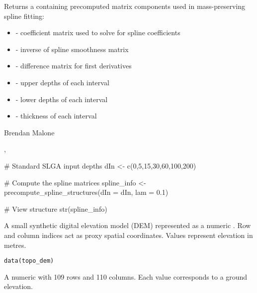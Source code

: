 \documentclass[a4paper]{book}
\begin{document}
\begin{Value}
Returns a  containing precomputed matrix components used in mass-preserving spline fitting:
\begin{itemize}

\item{}  - coefficient matrix used to solve for spline coefficients
\item{}  - inverse of spline smoothness matrix
\item{}  - difference matrix for first derivatives
\item{}  - upper depths of each interval
\item{}  - lower depths of each interval
\item{}  - thickness of each interval

\end{itemize}

\end{Value}
%
\begin{Author}
Brendan Malone
\end{Author}
%
\begin{SeeAlso}
, 
\end{SeeAlso}
%
\begin{Examples}
\begin{ExampleCode}
# Standard SLGA input depths
dIn <- c(0,5,15,30,60,100,200)

# Compute the spline matrices
spline_info <- precompute_spline_structures(dIn = dIn, lam = 0.1)

# View structure
str(spline_info)
\end{ExampleCode}
\end{Examples}
%
\begin{Description}
A small synthetic digital elevation model (DEM) represented as a numeric . Row and column indices act as proxy spatial coordinates. Values represent elevation in metres.
\end{Description}
%
\begin{Usage}
\begin{verbatim}
data(topo_dem)
\end{verbatim}
\end{Usage}
%
\begin{Format}
A numeric  with 109 rows and 110 columns. Each value corresponds to a ground elevation.
\end{Format}
\end{document}
